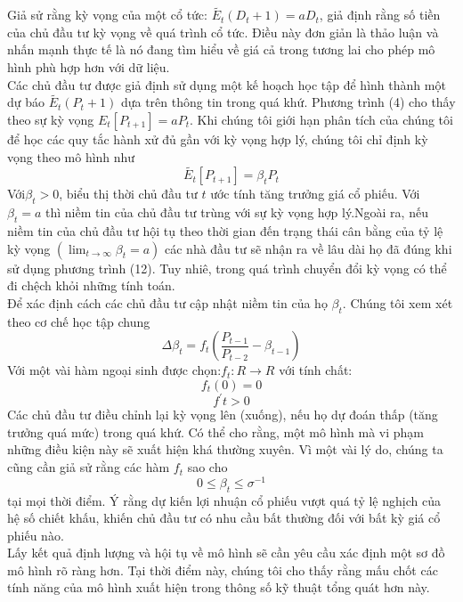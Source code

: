 \documentclass[10pt,a4paper]{article}
\begin{document}
	Giả sử rằng kỳ vọng của một cổ tức: $\tilde{E_t}(D_t+1)=aD_t$, giả định rằng số tiền của chủ đầu tư kỳ vọng về quá trình cổ tức. Điều này đơn giản là thảo luận và nhấn mạnh thực tế là nó đang tìm hiểu về giá cả trong tương lai cho phép mô hình phù hợp hơn với dữ liệu.\\
	Các chủ đầu tư được giả định sử dụng một kế hoạch học tập để hình thành một dự báo
	$\tilde{E_t}(P_t+1)$ dựa trên thông tin trong quá khứ. Phương trình (4) cho thấy theo sự
	kỳ vọng $E_t[P_{t+1}]=aP_t$. Khi chúng tôi giới hạn phân tích của chúng tôi để học các quy tắc hành xử đủ gần với kỳ vọng hợp lý, chúng tôi chỉ định kỳ vọng theo mô hình như
	\begin{equation}
	\tilde{E_t}[P_{t+1}] =\beta_t P_t
	\end{equation}
	Với$\beta_t>0$, biểu thị thời chủ đầu tư  $t$ ước tính tăng trưởng giá cổ phiếu. Với $\beta_t=a$ thì niềm tin của chủ đầu tư trùng với sự kỳ vọng hợp lý.Ngoài ra, nếu niềm tin của chủ đầu tư
	hội tụ theo thời gian đến trạng thái cân bằng của tỷ lệ kỳ vọng $(\lim_{t\to \infty}\beta_t=a)$ 
	các nhà đầu tư sẽ nhận ra về lâu dài họ đã đúng khi sử dụng phương trình (12). Tuy nhiê, trong quá trình chuyển đổi kỳ vọng có thể đi chệch khỏi những tính toán.\\
	Để xác định cách các chủ đầu tư cập nhật niềm tin của họ $\beta_t$. Chúng tôi xem xét
	theo cơ chế học tập chung
	\begin{equation}
	\Delta\beta_t=f_t\left(\frac{P_{t-1}}{P_{t-2}}-\beta_{t-1}\right)
	\end{equation}
	Với một vài hàm ngoại sinh được chọn:$f_t:R\to R$ với tính chất:
	$$f_t(0)=0$$
	$$f^{'}t>0$$
	Các chủ đầu tư điều chỉnh lại kỳ vọng lên (xuống), nếu họ dự đoán thấp (tăng trưởng quá mức) trong quá khứ. Có thể cho rằng, một mô hình  mà vi phạm những điều kiện này sẽ xuất hiện khá thường xuyên. Vì một vài lý do, chúng ta cũng cần giả sử rằng các hàm $f_t$ sao cho
	\begin{equation}
	0 \leq\beta_t\leq\sigma^{-1}
	\end{equation}
	tại mọi thời điểm. Ý rằng dự kiến lợi nhuận cổ phiếu vượt quá tỷ lệ nghịch của hệ số chiết khấu, khiến chủ đầu tư có nhu cầu bất thường đối với bất kỳ giá cổ phiếu nào.\\
	Lấy kết quả định lượng và hội tụ về mô hình sẽ cần yêu cầu xác định một sơ đồ mô hình rõ ràng hơn. Tại thời điểm này, chúng tôi cho thấy rằng mấu chốt các tính năng của mô hình xuất hiện trong thông số kỹ thuật tổng quát hơn này.
\end{document}
